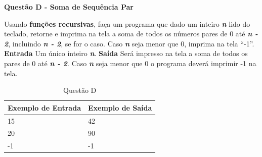 \documentclass[a4paper, 12pt]{article}
\begin{document}
\newpage %
\begin{center}
\textbf{{\Large Questão D - Soma de Sequência Par}}
\end{center}
\vspace{5pt}
Usando \textbf{funções recursivas}, faça um programa que dado um inteiro \textbf{\textit{n}} lido do
teclado, retorne e imprima na tela a soma de todos os números pares de 0 até
\textbf{\textit{n - 2}}, incluindo \textbf{\textit{n - 2}}, se for o caso. Caso \textbf{\textit{n}} seja menor que 0, imprima na tela ``-1''.
\newline \newline
\textbf{{\large Entrada}} \newline 
Um único inteiro \textbf{\textit{n}}.
\newline \newline
\textbf{{\large Saída}} \newline
Será impresso na tela a soma de todos os pares de 0 até \textbf{\textit{n - 2}}. Caso \textbf{\textit{n}} seja menor que 0 o programa deverá imprimir -1 na tela.
\newline
\begin{table}[H]
	\centering
	\begin{tabular}{|l|l|}
	\hline
	\textbf{Exemplo de Entrada} & \textbf{Exemplo de Saída} \\ \hline
	15 & 42 \\ \hline
	20 & 90 \\ \hline
	-1 & -1 \\ \hline
	\end{tabular}
	\caption{Questão D}
	\label{tabela4}
\end{table}
\end{document}
